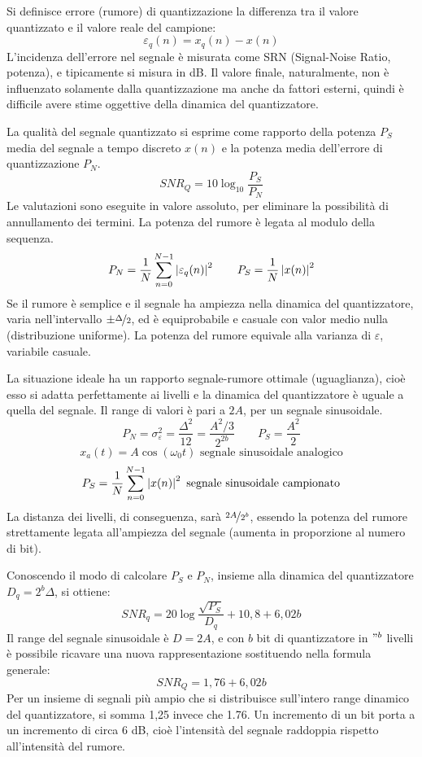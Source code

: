 Si definisce errore (rumore) di quantizzazione la differenza tra il valore quantizzato e il valore reale del campione:
$$\varepsilon_q(n) = x_q(n) - x(n)$$
L'incidenza dell'errore nel segnale è misurata come SRN (Signal-Noise Ratio, potenza), e tipicamente si misura in dB. Il valore finale, naturalmente, non è influenzato solamente dalla quantizzazione ma anche da fattori esterni, quindi è difficile avere stime oggettive della dinamica del quantizzatore.

La qualità del segnale quantizzato si esprime come rapporto della potenza $P_S$ media del segnale a tempo discreto $x(n)$ e la potenza media dell'errore di quantizzazione $P_N$.
$$SNR_Q = 10\log_{10}\frac{P_S}{P_N}$$
Le valutazioni sono eseguite in valore assoluto, per eliminare la possibilità di annullamento dei termini. La potenza del rumore è legata al modulo della sequenza. 
$$P_N = \frac{1}{N}\sum_{n=0}^{N-1}\left|\varepsilon_q(n)\right|^2 \qquad P_S = \frac{1}{N}\left|x(n)\right|^2$$
Se il rumore è semplice e il segnale ha ampiezza nella dinamica del quantizzatore, varia nell'intervallo $\pm \nicefrac{\Delta}{2}$, ed è equiprobabile e casuale con valor medio nulla (distribuzione uniforme). La potenza del rumore equivale alla varianza di $\varepsilon$, variabile casuale.

La situazione ideale ha un rapporto segnale-rumore ottimale (uguaglianza), cioè esso si adatta perfettamente ai livelli e la dinamica del quantizzatore è uguale a quella del segnale. Il range di valori è pari a $2A$, per un segnale sinusoidale.
$$P_N = \sigma^2_\varepsilon = \frac{\Delta^2}{12} = \frac{A^2/3}{2^{2b}} \qquad P_S = \frac{A^2}{2}$$
$$x_a(t) = A\cos(\omega_0t) \text{ segnale sinusoidale analogico}$$
$$P_S = \frac{1}{N} \sum_{n=0}^{N-1}\left|x(n)\right|^2 \text{ segnale sinusoidale campionato}$$
La distanza dei livelli, di conseguenza, sarà $\nicefrac{2A}{2^b}$, essendo la potenza del rumore strettamente legata all'ampiezza del segnale (aumenta in proporzione al numero di bit).

Conoscendo il modo di calcolare $P_S$ e $P_N$, insieme alla dinamica del quantizzatore $D_q = 2^b\Delta$, si ottiene:
$$SNR_q = 20\log\frac{\sqrt{P_S}}{D_q} + 10,8 + 6,02b$$
Il range del segnale sinusoidale è $D = 2A$, e con $b$ bit di quantizzatore in $"^b$ livelli è possibile ricavare una nuova rappresentazione sostituendo nella formula generale:
$$SNR_Q = 1,76 + 6,02b$$
Per un insieme di segnali più ampio che si distribuisce sull'intero range dinamico del quantizzatore, si somma 1,25 invece che 1.76. Un incremento di un bit porta a un incremento di circa 6 dB, cioè l'intensità del segnale raddoppia rispetto all'intensità del rumore.

